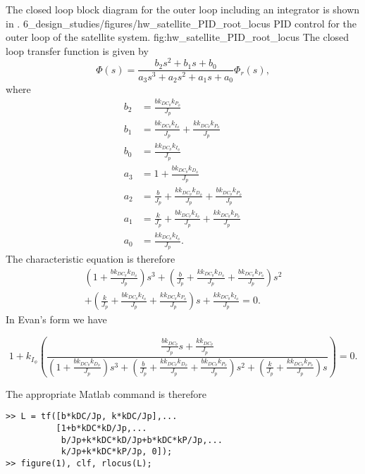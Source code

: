 
The closed loop block diagram for the outer loop including an integrator is shown in .  
	{6_design_studies/figures/hw_satellite_PID_root_locus}
	{PID control for the outer loop of the satellite system.}
	{fig:hw_satellite_PID_root_locus}
The closed loop transfer function is given by
\[
\Phi(s) = \frac{b_2s^2 + b_1 s + b_0}{a_3s^3+a_2s^2+a_1s+a_0}\Phi_r(s),
\]
where
\begin{align*}
b_2 &=\frac{bk_{DC_\theta}k_{P_\phi}}{J_p} \\
b_1 &= \frac{bk_{DC_\theta}k_{I_\phi}}{J_p}+\frac{kk_{DC_\theta}k_{P_\phi}}{J_p} \\
b_0 &= \frac{kk_{DC_\theta}k_{I_\phi}}{J_p} \\
a_3 &= 1+\frac{bk_{DC_\theta}k_{D_\phi}}{J_p} \\
a_2 &= \frac{b}{J_p}+\frac{kk_{DC_\theta}k_{D_\phi}}{J_p}+\frac{bk_{DC_\theta}k_{P_\phi}}{J_p} \\
a_1 &= \frac{k}{J_p}+\frac{bk_{DC_\theta}k_{I_\phi}}{J_p}+\frac{kk_{DC_\theta}k_{P_\phi}}{J_p} \\
a_0 &= \frac{kk_{DC_\theta}k_{I_\phi}}{J_p}.
\end{align*}
The characteristic equation is therefore
\begin{multline*}
\left(1+\frac{bk_{DC_\theta}k_{D_\phi}}{J_p}\right)s^3 
+ \left(\frac{b}{J_p}+\frac{kk_{DC_\theta}k_{D_\phi}}{J_p}+\frac{bk_{DC_\theta}k_{P_\phi}}{J_p}\right)s^2 \\ + \left(\frac{k}{J_p}+\frac{bk_{DC_\theta}k_{I_\phi}}{J_p}+\frac{kk_{DC_\theta}k_{P_\phi}}{J_p}\right)s + \frac{kk_{DC_\theta}k_{I_\phi}}{J_p} = 0.
\end{multline*}
In Evan's form we have
\begin{strip}
\[
1 + k_{I_\phi}\left(\frac{\frac{bk_{DC_\theta}}{J_p}s+\frac{kk_{DC_\theta}}{J_p}}
{\left(1+\frac{bk_{DC_\theta}k_{D_\phi}}{J_p}\right)s^3 + \left(\frac{b}{J_p}+\frac{kk_{DC_\theta}k_{D_\phi}}{J_p}+\frac{bk_{DC_\theta}k_{P_\phi}}{J_p}\right)s^2 + \left(\frac{k}{J_p}+\frac{kk_{DC_\theta}k_{P_\phi}}{J_p}\right)s}
\right) = 0.
\]
\end{strip}
The appropriate Matlab command is therefore
\begin{lstlisting}
>> L = tf([b*kDC/Jp, k*kDC/Jp],...
          [1+b*kDC*kD/Jp,...
           b/Jp+k*kDC*kD/Jp+b*kDC*kP/Jp,...
           k/Jp+k*kDC*kP/Jp, 0]);
>> figure(1), clf, rlocus(L);
\end{lstlisting}
